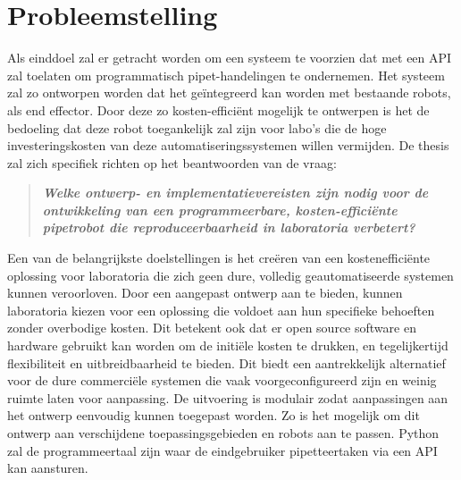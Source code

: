 \section{Probleemstelling}
Als einddoel zal er getracht worden om een systeem te voorzien dat met een API zal toelaten om programmatisch pipet-handelingen te ondernemen. Het systeem zal zo ontworpen worden dat het geïntegreerd kan worden met bestaande robots, als end effector. Door deze zo kosten-efficiënt mogelijk te ontwerpen is het de bedoeling dat deze robot toegankelijk zal zijn voor labo’s die de hoge investeringskosten van deze automatiseringssystemen willen vermijden. De thesis zal zich specifiek richten op het beantwoorden van de vraag:\begin{quote}
    \begin{center}
        \textbf{\textit{Welke ontwerp- en implementatievereisten zijn nodig voor de ontwikkeling van een programmeerbare, kosten-efficiënte pipetrobot die reproduceerbaarheid in laboratoria verbetert?}}
    \end{center}
\end{quote}
Een van de belangrijkste doelstellingen is het creëren van een kostenefficiënte oplossing voor laboratoria die zich geen dure, volledig geautomatiseerde systemen kunnen veroorloven. Door een aangepast ontwerp aan te bieden, kunnen laboratoria kiezen voor een oplossing die voldoet aan hun specifieke behoeften zonder overbodige kosten. Dit betekent ook dat er open source software en hardware gebruikt kan worden om de initiële kosten te drukken, en tegelijkertijd flexibiliteit en uitbreidbaarheid te bieden. Dit biedt een aantrekkelijk alternatief voor de dure commerciële systemen die vaak voorgeconfigureerd zijn en weinig ruimte laten voor aanpassing. De uitvoering is modulair zodat aanpassingen aan het ontwerp eenvoudig kunnen toegepast worden. Zo is het mogelijk om dit ontwerp aan verschijdene toepassingsgebieden en robots aan te passen. Python zal de programmeertaal zijn waar de eindgebruiker pipetteertaken via een API kan aansturen.